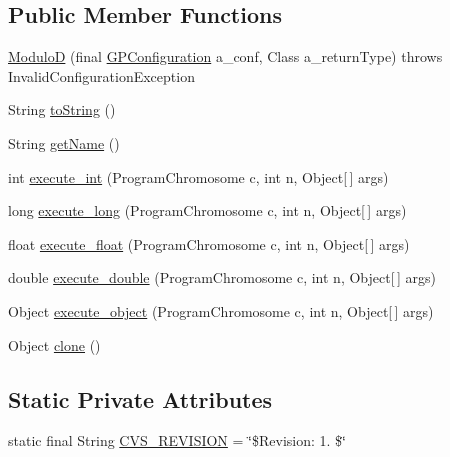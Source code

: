 \subsection*{Public Member Functions}
\begin{DoxyCompactItemize}
\item 
\hyperlink{classexamples_1_1gp_1_1symbolic_regression_1_1_modulo_d_a1dba5c0be689dc6f2c247cb07feb0819}{Modulo\-D} (final \hyperlink{classorg_1_1jgap_1_1gp_1_1impl_1_1_g_p_configuration}{G\-P\-Configuration} a\-\_\-conf, Class a\-\_\-return\-Type)  throws Invalid\-Configuration\-Exception 
\item 
String \hyperlink{classexamples_1_1gp_1_1symbolic_regression_1_1_modulo_d_a521b78cfb99251e694a38e35406391a6}{to\-String} ()
\item 
String \hyperlink{classexamples_1_1gp_1_1symbolic_regression_1_1_modulo_d_ad1341a1872a5fdfb557b5aa0e1751e50}{get\-Name} ()
\item 
int \hyperlink{classexamples_1_1gp_1_1symbolic_regression_1_1_modulo_d_a5504ffe7797721a35b5c9fa45455a246}{execute\-\_\-int} (Program\-Chromosome c, int n, Object\mbox{[}$\,$\mbox{]} args)
\item 
long \hyperlink{classexamples_1_1gp_1_1symbolic_regression_1_1_modulo_d_ac6d902fa7585ea698556f5ae6c743495}{execute\-\_\-long} (Program\-Chromosome c, int n, Object\mbox{[}$\,$\mbox{]} args)
\item 
float \hyperlink{classexamples_1_1gp_1_1symbolic_regression_1_1_modulo_d_a6d2f29a47f48da3fbb0641a98514bbab}{execute\-\_\-float} (Program\-Chromosome c, int n, Object\mbox{[}$\,$\mbox{]} args)
\item 
double \hyperlink{classexamples_1_1gp_1_1symbolic_regression_1_1_modulo_d_a9a8bbb6d5617d06ec08c810bd72ca9b7}{execute\-\_\-double} (Program\-Chromosome c, int n, Object\mbox{[}$\,$\mbox{]} args)
\item 
Object \hyperlink{classexamples_1_1gp_1_1symbolic_regression_1_1_modulo_d_af8acb3b3312f9beb327acaefb173e6bd}{execute\-\_\-object} (Program\-Chromosome c, int n, Object\mbox{[}$\,$\mbox{]} args)
\item 
Object \hyperlink{classexamples_1_1gp_1_1symbolic_regression_1_1_modulo_d_abaa51ab57de56c37eb0c0e23bdb65a67}{clone} ()
\end{DoxyCompactItemize}
\subsection*{Static Private Attributes}
\begin{DoxyCompactItemize}
\item 
static final String \hyperlink{classexamples_1_1gp_1_1symbolic_regression_1_1_modulo_d_a6c02cb522fbc6ae5f4b2cf25a3e154c4}{C\-V\-S\-\_\-\-R\-E\-V\-I\-S\-I\-O\-N} = \char`\"{}\$Revision\-: 1. \$\char`\"{}
\end{DoxyCompactItemize}


